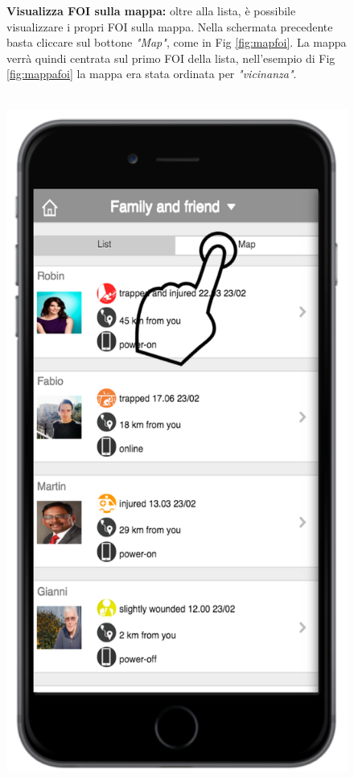  \begin{figure}
 \textbf{Visualizza FOI sulla mappa:} oltre alla lista, è possibile visualizzare i propri FOI sulla mappa. Nella schermata precedente basta cliccare sul bottone \textit{"Map"}, come in Fig \ref{fig:mapfoi}. La mappa verrà quindi centrata sul primo FOI della lista, nell'esempio di Fig \ref{fig:mappafoi} la mappa era stata ordinata per \textit{"vicinanza"}.
 \\ \\
 \begin{minipage}[b]{6cm}
   \centering
\includegraphics[scale=0.6]{interfaccia/mapfoi.png}

\end{minipage}
\end{figure}
